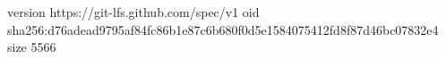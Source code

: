 version https://git-lfs.github.com/spec/v1
oid sha256:d76adead9795af84fc86b1e87c6b680f0d5e1584075412fd8f87d46bc07832e4
size 5566
